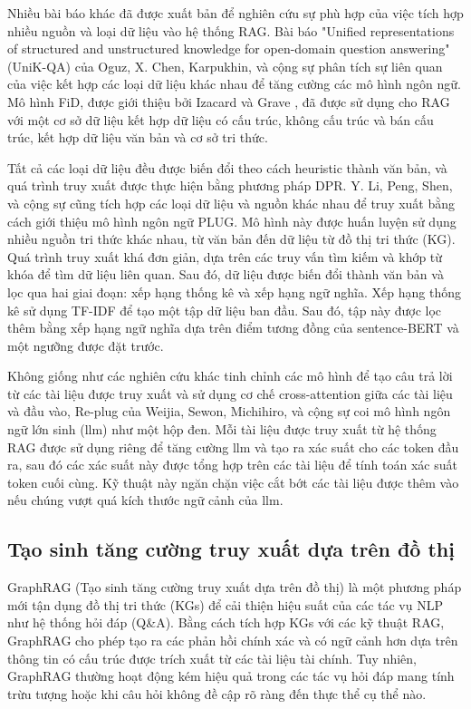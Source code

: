 Nhiều bài báo khác đã được xuất bản để nghiên cứu sự phù hợp của việc tích hợp nhiều nguồn và loại dữ liệu vào hệ thống RAG. Bài báo "Unified representations of structured and unstructured knowledge for open-domain question answering" (UniK-QA) của Oguz, X. Chen, Karpukhin, và cộng sự \cite{oguz2020unikqa} phân tích sự liên quan của việc kết hợp các loại dữ liệu khác nhau để tăng cường các mô hình ngôn ngữ. Mô hình FiD, được giới thiệu bởi Izacard và Grave \cite{izacard2020leveraging}, đã được sử dụng cho RAG với một cơ sở dữ liệu kết hợp dữ liệu có cấu trúc, không cấu trúc và bán cấu trúc, kết hợp dữ liệu văn bản và cơ sở tri thức.

Tất cả các loại dữ liệu đều được biến đổi theo cách heuristic thành văn bản, và quá trình truy xuất được thực hiện bằng phương pháp DPR. Y. Li, Peng, Shen, và cộng sự \cite{li2021knowledge} cũng tích hợp các loại dữ liệu và nguồn khác nhau để truy xuất bằng cách giới thiệu mô hình ngôn ngữ PLUG. Mô hình này được huấn luyện sử dụng nhiều nguồn tri thức khác nhau, từ văn bản đến dữ liệu từ đồ thị tri thức (KG). Quá trình truy xuất khá đơn giản, dựa trên các truy vấn tìm kiếm và khớp từ khóa để tìm dữ liệu liên quan. Sau đó, dữ liệu được biến đổi thành văn bản và lọc qua hai giai đoạn: xếp hạng thống kê và xếp hạng ngữ nghĩa. Xếp hạng thống kê sử dụng TF-IDF để tạo một tập dữ liệu ban đầu. Sau đó, tập này được lọc thêm bằng xếp hạng ngữ nghĩa dựa trên điểm tương đồng của sentence-BERT và một ngưỡng được đặt trước.

Không giống như các nghiên cứu khác tinh chỉnh các mô hình để tạo câu trả lời từ các tài liệu được truy xuất và sử dụng cơ chế cross-attention giữa các tài liệu và đầu vào, Re-plug của Weijia, Sewon, Michihiro, và cộng sự \cite{weijia2023replug} coi mô hình ngôn ngữ lớn sinh (\gls{llm}) như một hộp đen. Mỗi tài liệu được truy xuất từ hệ thống RAG được sử dụng riêng để tăng cường \gls{llm} và tạo ra xác suất cho các token đầu ra, sau đó các xác suất này được tổng hợp trên các tài liệu để tính toán xác suất token cuối cùng. Kỹ thuật này ngăn chặn việc cắt bớt các tài liệu được thêm vào nếu chúng vượt quá kích thước ngữ cảnh của \gls{llm}.

\subsection{Tạo sinh tăng cường truy xuất dựa trên đồ thị}
\label{subsection:graph_based_rag}

GraphRAG (Tạo sinh tăng cường truy xuất dựa trên đồ thị) \cite{cao2007learning,nogueira2019passage,guu2020realm,izacard2020leveraging,borgeaud2022improving,oguz2020unikqa} là một phương pháp mới tận dụng đồ thị tri thức (KGs) để cải thiện hiệu suất của các tác vụ NLP như hệ thống hỏi đáp (Q\&A). Bằng cách tích hợp KGs với các kỹ thuật RAG, GraphRAG cho phép tạo ra các phản hồi chính xác và có ngữ cảnh hơn dựa trên thông tin có cấu trúc được trích xuất từ các tài liệu tài chính. Tuy nhiên, GraphRAG thường hoạt động kém hiệu quả trong các tác vụ hỏi đáp mang tính trừu tượng hoặc khi câu hỏi không đề cập rõ ràng đến thực thể cụ thể nào.

